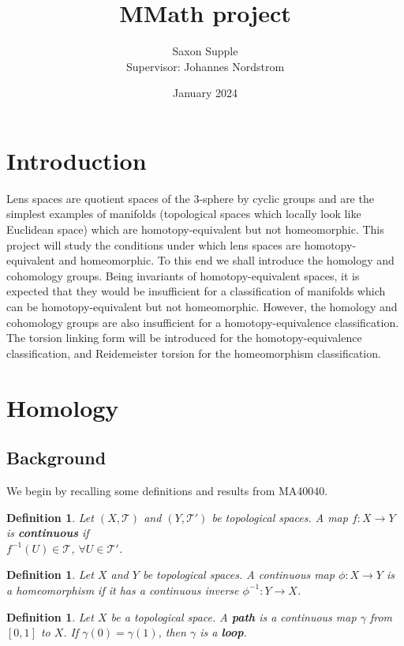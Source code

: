 \documentclass{article}
\title{MMath project}
\author{Saxon Supple\\Supervisor: Johannes Nordstrom}
\date{January 2024}
\newtheorem{definition}[theorem]{Definition}
\begin{document}
\maketitle

\section{Introduction}
Lens spaces are quotient spaces of the $3$-sphere by cyclic groups and are the simplest examples of manifolds (topological spaces which locally look like Euclidean space) which are homotopy-equivalent but not homeomorphic. This project will study the conditions under which lens spaces are homotopy-equivalent and homeomorphic. To this end we shall introduce the homology and cohomology groups. Being invariants of homotopy-equivalent spaces, it is expected that they would be insufficient for a classification of manifolds which can be homotopy-equivalent but not homeomorphic. However, the homology and cohomology groups are also insufficient for a homotopy-equivalence classification. The torsion linking form will be introduced for the homotopy-equivalence classification, and Reidemeister torsion for the homeomorphism classification.
\section{Homology}
\subsection{Background}
We begin by recalling some definitions and results from MA40040.
\begin{definition}
Let $(X,\mathcal{T})$ and $(Y,\mathcal{T}')$ be topological spaces. A map $f\colon X\to Y$ is \textbf{continuous} if\\
$f^{-1}(U)\in\mathcal{T}$, $\forall U\in\mathcal{T}'$.
\end{definition}

\begin{definition}
Let $X$ and $Y$ be topological spaces. A continuous map $\phi\colon X\to Y$ is a homeomorphism if it has a continuous inverse $\phi^{-1}\colon Y\to X$.
\end{definition}

\begin{definition}
Let $X$ be a topological space. A \textbf{path} is a continuous map $\gamma$ from $[0,1]$ to $X$. If $\gamma(0)=\gamma(1)$, then $\gamma$ is a \textbf{loop}.
\end{definition}
\end{document}

